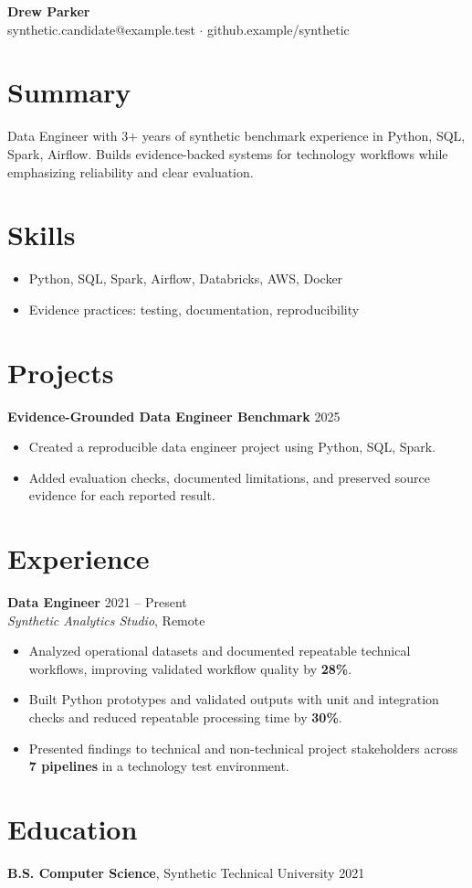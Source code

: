 \documentclass[10pt,letterpaper]{article}
\begin{document}
\begin{center}
{\Large \textbf{Drew Parker}}\\
synthetic.candidate@example.test $\cdot$ github.example/synthetic
\end{center}

\section*{Summary}
Data Engineer with 3+ years of synthetic benchmark experience in Python, SQL, Spark, Airflow. Builds evidence-backed systems for technology workflows while emphasizing reliability and clear evaluation.

\section*{Skills}
\begin{itemize}
  \item Python, SQL, Spark, Airflow, Databricks, AWS, Docker
  \item Evidence practices: testing, documentation, reproducibility
\end{itemize}

\section*{Projects}
\textbf{Evidence-Grounded Data Engineer Benchmark} \hfill 2025
\begin{itemize}
  \item Created a reproducible data engineer project using Python, SQL, Spark.
  \item Added evaluation checks, documented limitations, and preserved source evidence for each reported result.
\end{itemize}

\section*{Experience}
\textbf{Data Engineer} \hfill 2021 -- Present\\
\textit{Synthetic Analytics Studio}, Remote
\begin{itemize}
  \item Analyzed operational datasets and documented repeatable technical workflows, improving validated workflow quality by \textbf{28\%}.
  \item Built Python prototypes and validated outputs with unit and integration checks and reduced repeatable processing time by \textbf{30\%}.
  \item Presented findings to technical and non-technical project stakeholders across \textbf{7 pipelines} in a technology test environment.
\end{itemize}

\section*{Education}
\textbf{B.S. Computer Science}, Synthetic Technical University \hfill 2021
\end{document}
